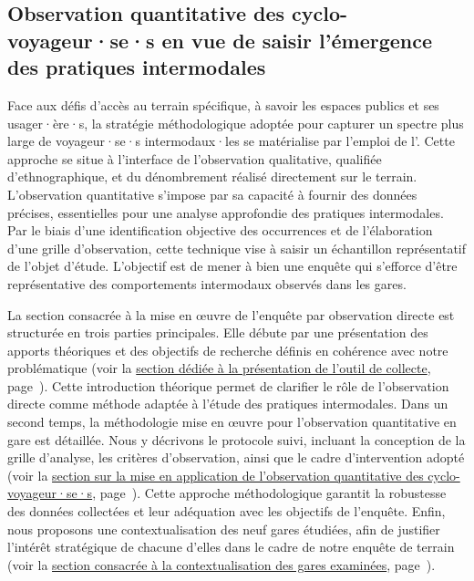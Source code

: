 \begin{refsegment}
    \newpage
\section{Observation quantitative des cyclo-voyageur·se·s en vue de saisir l’émergence des pratiques intermodales
    \label{chap3:observation-quantitative}
    }

Face aux défis d'accès au terrain spécifique, à savoir les espaces publics et ses usager·ère·s, la stratégie méthodologique adoptée pour capturer un spectre plus large de voyageur·se·s intermodaux·les se matérialise par l'emploi de l'. Cette approche se situe à l'interface de l'observation qualitative, qualifiée d'ethnographique, et du dénombrement réalisé directement sur le terrain. L'observation quantitative s'impose par sa capacité à fournir des données précises, essentielles pour une analyse approfondie des pratiques intermodales. Par le biais d'une identification objective des occurrences et de l'élaboration d'une grille d'observation, cette technique vise à saisir un échantillon représentatif de l'objet d'étude. L'objectif est de mener à bien une enquête qui s'efforce d'être représentative des comportements intermodaux observés dans les gares.%

La section consacrée à la mise en œuvre de l’enquête par observation directe est structurée en trois parties principales. Elle débute par une présentation des apports théoriques et des objectifs de recherche définis en cohérence avec notre problématique (voir la \hyperref[chap3:observation-quantitative-outil-adapte]{section dédiée à la présentation de l’outil de collecte}, page~\pageref{chap3:observation-quantitative-outil-adapte}). Cette introduction théorique permet de clarifier le rôle de l’observation directe comme méthode adaptée à l’étude des pratiques intermodales. Dans un second temps, la méthodologie mise en œuvre pour l’observation quantitative en gare est détaillée. Nous y décrivons le protocole suivi, incluant la conception de la grille d’analyse, les critères d’observation, ainsi que le cadre d’intervention adopté (voir la \hyperref[chap3:methodologie-observation-quantitative]{section sur la mise en application de l’observation quantitative des cyclo-voyageur·se·s}, page~\pageref{chap3:methodologie-observation-quantitative}). Cette approche méthodologique garantit la robustesse des données collectées et leur adéquation avec les objectifs de l’enquête. Enfin, nous proposons une contextualisation des neuf gares étudiées, afin de justifier l’intérêt stratégique de chacune d’elles dans le cadre de notre enquête de terrain (voir la \hyperref[chap3:observation-quantitative-gares-examinees]{section consacrée à la contextualisation des gares examinées}, page~\pageref{chap3:observation-quantitative-gares-examinees}).%


\end{refsegment}
